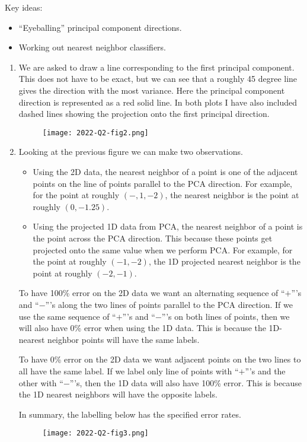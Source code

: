 Key ideas:
\begin{itemize}
    \item ``Eyeballing'' principal component directions.
    \item Working out nearest neighbor classifiers.
\end{itemize}
\begin{enumerate}
    \item We are asked to draw a line corresponding to the first principal component. This does not have to be exact, but we can see that a roughly 45 degree line gives the direction with the most variance. Here the principal component direction is represented as a red solid line. In both plots I have also included dashed lines showing the projection onto the first principal direction.
    \begin{figure}[h]
        \begin{center}
            \texttt{[image: 2022-Q2-fig2.png]}
        \end{center}
    \end{figure}
    \item Looking at the previous figure we can make two observations. 
    \begin{itemize}
        \item Using the 2D data, the nearest neighbor of a point is one of the adjacent points on the line of points parallel to the PCA direction. For example, for the point at roughly $(-,1,-2)$, the nearest neighbor is the point at roughly $(0,-1.25)$.
        \item Using the projected 1D data from PCA, the nearest neighbor of a point is the point across the PCA direction. This because these points get projected onto the same value when we perform PCA. For example, for the point at roughly $(-1,-2)$, the 1D projected nearest neighbor is the point at roughly $(-2,-1)$.
    \end{itemize}
    To have 100\% error on the 2D data we want an alternating sequence of ``$+$'''s and ``$-$'''s along the two lines of points parallel to the PCA direction. If we use the same sequence of ``$+$'''s and ``$-$'''s on both lines of points, then we will also have 0\% error when using the 1D data. This is because the 1D-nearest neighbor points will have the same labels. 

    To have 0\% error on the 2D data we want adjacent points on the two lines to all have the same label. If we label only line of points with ``$+$'''s and the other with ``$-$'''s, then the 1D data will also have 100\% error. This is because the 1D nearest neighbors will have the opposite labels. 
    
    In summary, the labelling below has the specified error rates.
    \begin{figure}
        [h]
        \begin{center}
            \texttt{[image: 2022-Q2-fig3.png]}
        \end{center}
    \end{figure}
\end{enumerate}

